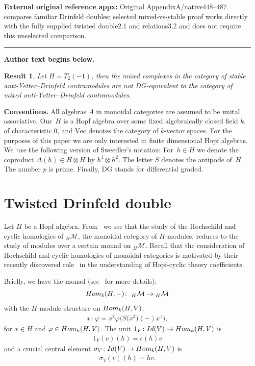 \documentclass[11pt]{article}
\numberwithin{equation}{section}
\numberwithin{equation}{section}
\newtheorem{prop}[Theorem]{Result}
 { \theoremstyle{definition}
\newtheorem{Definition}[Theorem]{Definition}
\newtheorem{Note}[Theorem]{Note}
\newtheorem{Example}[Theorem]{Example}
\newtheorem{Remark}[Theorem]{Remark} }
\newcommand{\hmod}{{_H\mathcal{M}}}
\newcommand{\vect}{\text{Vec}}
\newcommand{\ot}{\otimes}
\begin{document}
\noindent\textbf{External original reference appx:} Original AppendixA/native448–487 compares familiar Drinfeld doubles; selected mixed-vs-stable proof works directly with the fully supplied twisted double2.1 and relations3.2 and does not require this unselected comparison.\par
\medskip\hrule\medskip\noindent\textbf{Author text begins below.}\par
\setcounter{section}{1}\setcounter{Theorem}{1}
\begin{prop}
Let $H=T_2(-1)$, then the mixed complexes in the category of stable anti-Yetter--Drinfeld contramodules are not DG-equivalent to the category of mixed anti-Yetter--Drinfeld contramodules.
\end{prop}

\setcounter{section}{1}
\noindent \textbf{Conventions.} All algebras $A$ in monoidal categories are assumed to be unital associative. Our~$H$ is a Hopf algebra over some fixed algebraically closed field $k$, of characteristic $0$, and $\vect$ denotes the category of $k$-vector spaces. For the purposes of this paper we are only interested in finite dimensional Hopf algebras. We~use the following version of Sweedler's notation: For~$h\in H$ we denote the coproduct $\Delta(h)\in H\ot H$ by $h^1\ot h^2$. The letter $S$ denotes the antipode of~$H$. The number $p$ is prime. Finally, DG stands for differential graded.

\section{Twisted Drinfeld double}
Let $H$ be a Hopf algebra. From~\cite{chern} we see that the study of the Hochschild and cyclic homologies of $\hmod$, the monoidal category of $H$-modules, reduces to the study of modules over a certain monad on $\hmod$. Recall that the consideration of Hochschild and cyclic homologies of monoidal categories is motivated by their recently discovered role~\cite{chern} in the understanding of Hopf-cyclic theory coefficients.

Briefly, we have the monad (see~\cite{chern} for more details):
\begin{gather}\label{themonad}
\mathop{\rm Hom}\nolimits_k(H,-)\colon \ \hmod\to\hmod
\end{gather}
with the $H$-module structure on $\mathop{\rm Hom}\nolimits_k(H,V)$:
\begin{gather}
x\cdot\varphi=x^2\varphi\big(S\big(x^3\big)(-)x^1\big),
\end{gather}
for $x\in H$ and $\varphi\in \mathop{\rm Hom}\nolimits_k(H,V)$. The unit $1_V\colon {\rm Id}(V)\to \mathop{\rm Hom}\nolimits_k(H,V)$ is
\begin{gather}
1_V(v)(h)=\epsilon(h)v
\end{gather}
and a crucial central element $\sigma_V\colon {\rm Id}(V)\to \mathop{\rm Hom}\nolimits_k(H,V)$ is
\begin{gather}
\sigma_V(v)(h)=hv.
\end{gather}
\end{document}
